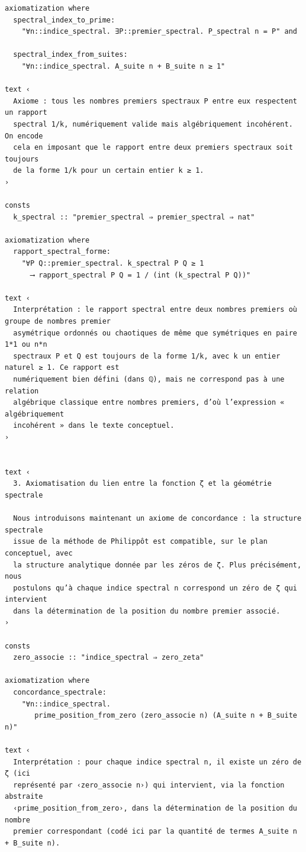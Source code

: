 \documentclass[a4paper,11pt]{article}
\begin{document}
\begin{holcode}[title={\textcolor{white}{Fichier : methode\_spectral.thy -- Partie 1/4}}]
\begin{lstlisting}
axiomatization where
  spectral_index_to_prime:
    "∀n::indice_spectral. ∃P::premier_spectral. P_spectral n = P" and

  spectral_index_from_suites:
    "∀n::indice_spectral. A_suite n + B_suite n ≥ 1"

text ‹
  Axiome : tous les nombres premiers spectraux P entre eux respectent un rapport
  spectral 1/k, numériquement valide mais algébriquement incohérent. On encode
  cela en imposant que le rapport entre deux premiers spectraux soit toujours
  de la forme 1/k pour un certain entier k ≥ 1.
›

consts
  k_spectral :: "premier_spectral ⇒ premier_spectral ⇒ nat"

axiomatization where
  rapport_spectral_forme:
    "∀P Q::premier_spectral. k_spectral P Q ≥ 1
      ⟶ rapport_spectral P Q = 1 / (int (k_spectral P Q))"

text ‹
  Interprétation : le rapport spectral entre deux nombres premiers où groupe de nombres premier   
  asymétrique ordonnés ou chaotiques de même que symétriques en paire 1*1 ou n*n
  spectraux P et Q est toujours de la forme 1/k, avec k un entier naturel ≥ 1. Ce rapport est
  numériquement bien défini (dans ℚ), mais ne correspond pas à une relation
  algébrique classique entre nombres premiers, d’où l’expression « algébriquement
  incohérent » dans le texte conceptuel.
›


text ‹
  3. Axiomatisation du lien entre la fonction ζ et la géométrie spectrale

  Nous introduisons maintenant un axiome de concordance : la structure spectrale
  issue de la méthode de Philippôt est compatible, sur le plan conceptuel, avec
  la structure analytique donnée par les zéros de ζ. Plus précisément, nous
  postulons qu’à chaque indice spectral n correspond un zéro de ζ qui intervient
  dans la détermination de la position du nombre premier associé.
›

consts
  zero_associe :: "indice_spectral ⇒ zero_zeta"

axiomatization where
  concordance_spectrale:
    "∀n::indice_spectral.
       prime_position_from_zero (zero_associe n) (A_suite n + B_suite n)"

text ‹
  Interprétation : pour chaque indice spectral n, il existe un zéro de ζ (ici
  représenté par ‹zero_associe n›) qui intervient, via la fonction abstraite
  ‹prime_position_from_zero›, dans la détermination de la position du nombre
  premier correspondant (codé ici par la quantité de termes A_suite n + B_suite n).


\end{lstlisting}
\end{holcode}
\end{document}
